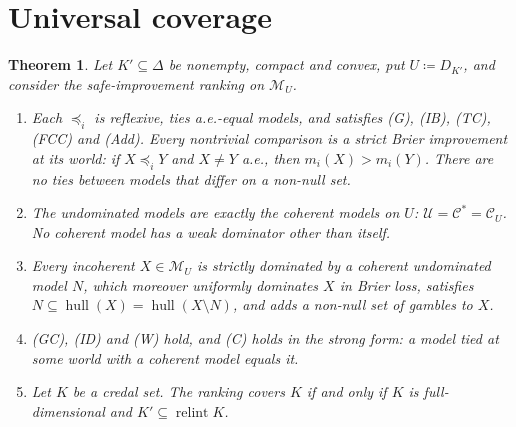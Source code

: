 \documentclass[11pt]{article}
\newcommand{\M}{\mathcal{M}}
\newcommand{\CC}{\mathcal{C}}
\newcommand{\UU}{\mathcal{U}}
\newcommand{\hull}{\operatorname{hull}}
\DeclareMathOperator{\relint}{relint}
\theoremstyle{plain}
\newtheorem{theorem}{Theorem}[section]
\theoremstyle{definition}
\theoremstyle{remark}
\begin{document}
\section{Universal coverage}\label{sec:main}

\begin{theorem}\label{thm:main}
Let $K'\subseteq\Delta$ be nonempty, compact and convex, put $U\coloneqq D_{K'}$, and
consider the safe-improvement ranking on $\M_U$.
\begin{enumerate}[label=(\alph*)]
  \item Each $\preceq_i$ is reflexive, ties a.e.-equal models, and satisfies (G), (IB),
  (TC), (FCC) and (Add). Every nontrivial comparison is a strict Brier improvement at its
  world: if $X\preceq_iY$ and $X\ne Y$ a.e., then $m_i(X)>m_i(Y)$. There are no ties
  between models that differ on a non-null set.
  \item The undominated models are exactly the coherent models on $U$:
  $\UU=\CC^\ast=\CC_U$. No coherent model has a weak dominator other than itself.
  \item Every incoherent $X\in\M_U$ is strictly dominated by a coherent undominated model
  $N$, which moreover uniformly dominates $X$ in Brier loss, satisfies $N\subseteq
  \hull(X)=\hull(X\setminus N)$, and adds a non-null set of gambles to $X$.
  \item (GC), (ID) and (W) hold, and (C) holds in the strong form: a model tied at some
  world with a coherent model equals it.
  \item Let $K$ be a credal set. The ranking covers $K$ if and only if $K$ is
  full-dimensional and $K'\subseteq\relint K$.
\end{enumerate}
\end{theorem}
\end{document}
